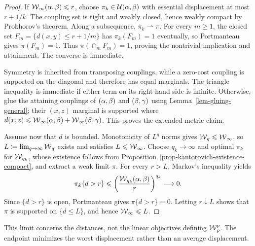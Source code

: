 \begin{proof}
If $\operatorname{\mathcal{W}}_\infty(\alpha,\beta)\leqslant r$, choose $\pi_k\in\mathcal{U}(\alpha,\beta)$ with essential displacement at most $r+1/k$. The coupling set is tight and weakly closed, hence weakly compact by Prokhorov's theorem. Along a subsequence, $\pi_k\rightharpoonup\pi$. For every $m\geq1$, the closed set $F_m=\{d(x,y)\leq r+1/m\}$ has $\pi_k(F_m)=1$ eventually, so Portmanteau gives $\pi(F_m)=1$. Thus $\pi(\cap_mF_m)=1$, proving the nontrivial implication and attainment. The converse is immediate.

Symmetry is inherited from transposing couplings, while a zero-cost coupling is supported on the diagonal and therefore has equal marginals. The triangle inequality is immediate if either term on its right-hand side is infinite. Otherwise, glue the attaining couplings of $(\alpha,\beta)$ and $(\beta,\gamma)$ using Lemma~\ref{lem-gluing-general}; their $(x,z)$ marginal is supported where $d(x,z)\leqslant\operatorname{\mathcal{W}}_\infty(\alpha,\beta)+\operatorname{\mathcal{W}}_\infty(\beta,\gamma)$. This proves the extended metric claim.

Assume now that $d$ is bounded. Monotonicity of $L^q$ norms gives $\operatorname{\mathcal{W}}_q\leqslant\operatorname{\mathcal{W}}_\infty$, so $L\coloneqq\lim_{q\to\infty}\operatorname{\mathcal{W}}_q$ exists and satisfies $L\leqslant\operatorname{\mathcal{W}}_\infty$. Choose $q_k\to\infty$ and optimal $\pi_k$ for $\operatorname{\mathcal{W}}_{q_k}$, whose existence follows from Proposition~\ref{prop-kantorovich-existence-compact}, and extract a weak limit $\pi$. For every $r>L$, Markov's inequality yields
\[
\pi_k\{d>r\}
\leqslant
\left(\frac{\operatorname{\mathcal{W}}_{q_k}(\alpha,\beta)}{r}\right)^{q_k}
\longrightarrow0.
\]
Since $\{d>r\}$ is open, Portmanteau gives $\pi\{d>r\}=0$. Letting $r\downarrow L$ shows that $\pi$ is supported on $\{d\leq L\}$, and hence $\operatorname{\mathcal{W}}_\infty\leqslant L$.
\end{proof}
This limit concerns the distances, not the linear objectives defining $\operatorname{\mathcal{W}}_p^p$. The endpoint minimizes the worst displacement rather than an average displacement.

